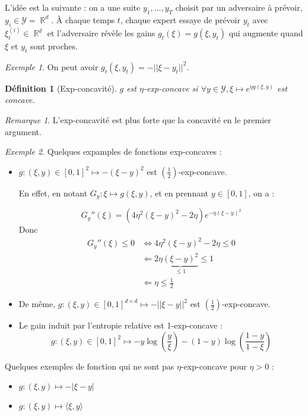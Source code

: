 \documentclass{article}
\DeclareMathOperator*{\R}{\mathbb{R}}
\newtheorem{definition}{Définition}[section]
\theoremstyle{remark}
\newtheorem{example}{Exemple}[section]
\theoremstyle{remark}
\newtheorem{remark}{Remarque}[section]
\begin{document}
L'idée est la suivante : on a une suite $y_1, ..., y_T$ choisit par un adversaire à prévoir, $y_i \in \mathcal{Y} = \R^d$. À chaque temps $t$, chaque expert essaye de prévoir $y_t$ avec $\xi_t^{(i)} \in \R^d$ et l'adversaire révèle les gains $g_t(\xi) = g(\xi, y_t)$ qui augmente quand $\xi$ et $y_t$ sont proches.

\begin{example}
   On peut avoir $g_t(\xi, y_t) = - || \xi - y_t||^2$.
\end{example}

\begin{definition}[Exp-concavité]
   $g$ est $\eta$-exp-concave si
   $\forall y \in \mathcal{Y}, \xi \mapsto e^{\eta g(\xi, y)}$ est concave.
\end{definition}

\begin{remark}
   L'exp-concavité est plus forte que la concavité en le premier argument.
\end{remark}

\begin{example}
   Quelques expamples de fonctions exp-concaves :
   \begin{itemize}
      \item $g : (\xi, y) \in [0,1]^2  \mapsto - (\xi - y)^2$ est $(\frac 1 2)$-exp-concave.

         En effet, en notant $G_y : \xi \mapsto g(\xi,y)$, et en prennant $y \in [0,1]$, on a :

         $$
         G_y''(\xi) = (4 \eta^2 (\xi - y)^2 - 2 \eta) e^{-\eta(\xi - y)^2}
         $$
         Donc
         \begin{align*}
            G_y''(\xi)  \leq 0 & \Leftrightarrow 4 \eta^2 (\xi - y)^2 - 2 \eta \leq 0  \\
            & \Leftarrow 2 \eta \underbrace{(\xi - y)^2}_{\leq 1} \leq 1 \\
            & \Leftarrow \eta \leq \frac 1 2
         \end{align*}
      \item De même, $g : (\xi, y) \in [0,1]^{d \times d}  \mapsto - ||\xi - y||^2$ est $(\frac 1 2)$-exp-concave.
      \item Le gain induit par l'entropie relative est 1-exp-concave :
         $$
            g: (\xi, y) \in [0,1]^2 \mapsto -y \log\left(\frac y \xi \right) - (1-y) \log\left(\frac{1-y}{1-\xi}\right)
         $$
   \end{itemize}

   Quelques exemples de fonction qui ne sont pas $\eta$-exp-concave pour $\eta > 0$ :
   \begin{itemize}
      \item $g: (\xi, y) \mapsto -|\xi-y|$
      \item $g: (\xi, y) \mapsto \langle \xi,y \rangle$
   \end{itemize}
\end{example}
\end{document}
